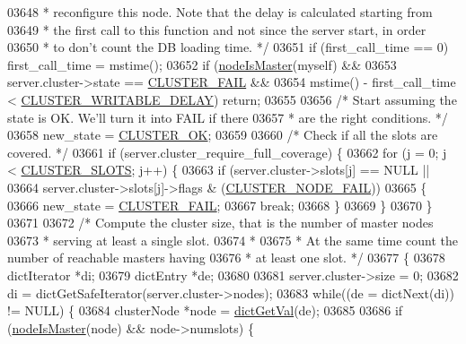 \begin{DoxyCode}
{{{{{{{{{{{{{{{{{{{{{{{{{{{{{{{{{{{{{{{{{{{{{{{{{{{{{{{{{{{{{03648 \textcolor{comment}{     * reconfigure this node. Note that the delay is calculated starting from}
03649 \textcolor{comment}{     * the first call to this function and not since the server start, in order}
03650 \textcolor{comment}{     * to don't count the DB loading time. */}
03651     \textcolor{keywordflow}{if} (first\_call\_time == 0) first\_call\_time = mstime();
03652     \textcolor{keywordflow}{if} (\hyperlink{cluster_8h_a2d8e84269474d8750565fb3fb67aa436}{nodeIsMaster}(myself) &&
03653         server.cluster->state == \hyperlink{cluster_8h_a4a46e6d5b85c594d08283dc6da2a32bf}{CLUSTER\_FAIL} &&
03654         mstime() - first\_call\_time < \hyperlink{cluster_8c_af5e38d5b0c4ba321bd893835975980b1}{CLUSTER\_WRITABLE\_DELAY}) \textcolor{keywordflow}{return};
03655 
03656     \textcolor{comment}{/* Start assuming the state is OK. We'll turn it into FAIL if there}
03657 \textcolor{comment}{     * are the right conditions. */}
03658     new\_state = \hyperlink{cluster_8h_adbda03922c45cac3cfc98a5c34a9d2d2}{CLUSTER\_OK};
03659 
03660     \textcolor{comment}{/* Check if all the slots are covered. */}
03661     \textcolor{keywordflow}{if} (server.cluster\_require\_full\_coverage) \{
03662         \textcolor{keywordflow}{for} (j = 0; j < \hyperlink{cluster_8h_aa3e2cb951eebb16725ecc3f5beefd9fd}{CLUSTER\_SLOTS}; j++) \{
03663             \textcolor{keywordflow}{if} (server.cluster->slots[j] == NULL ||
03664                 server.cluster->slots[j]->flags & (\hyperlink{cluster_8h_ad211e85c7baf8a5a59acd747e4e9005a}{CLUSTER\_NODE\_FAIL}))
03665             \{
03666                 new\_state = \hyperlink{cluster_8h_a4a46e6d5b85c594d08283dc6da2a32bf}{CLUSTER\_FAIL};
03667                 \textcolor{keywordflow}{break};
03668             \}
03669         \}
03670     \}
03671 
03672     \textcolor{comment}{/* Compute the cluster size, that is the number of master nodes}
03673 \textcolor{comment}{     * serving at least a single slot.}
03674 \textcolor{comment}{     *}
03675 \textcolor{comment}{     * At the same time count the number of reachable masters having}
03676 \textcolor{comment}{     * at least one slot. */}
03677     \{
03678         dictIterator *di;
03679         dictEntry *de;
03680 
03681         server.cluster->size = 0;
03682         di = dictGetSafeIterator(server.cluster->nodes);
03683         \textcolor{keywordflow}{while}((de = dictNext(di)) != NULL) \{
03684             clusterNode *node = \hyperlink{dict_8h_ae8d2cc391873b2bea2b87c4f80f43120}{dictGetVal}(de);
03685 
03686             \textcolor{keywordflow}{if} (\hyperlink{cluster_8h_a2d8e84269474d8750565fb3fb67aa436}{nodeIsMaster}(node) && node->numslots) \{
}}}}}}}}}}}}}}}}}}}}}}}}}}}}}}}}}}}}}}}}}}}}}}}}}}}}}}}}}}}}}
\end{DoxyCode}
